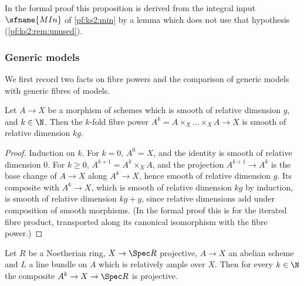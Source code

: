 In the formal proof this proposition is derived from the integral input $\sfname{MIn}$ of
\cref{pf:ks2:min} by a lemma which does not use that hypothesis (\cref{pf:ks2:rem:unused}).

\subsubsection{Generic models}

We first record two facts on fibre powers and the comparison of generic models with generic fibres
of models.

\begin{lemma}\label{pf:ks2:powsmooth}
Let $A\to X$ be a morphism of schemes which is smooth of relative dimension $g$, and $k\in\N$. Then
the $k$-fold fibre power $A^k=A\times_X\dots\times_XA\to X$ is smooth of relative dimension $kg$.
\end{lemma}

\begin{proof}
Induction on $k$. For $k=0$, $A^0=X$, and the identity is smooth of relative dimension $0$. For
$k\ge0$, $A^{k+1}=A^k\times_XA$, and the projection $A^{k+1}\to A^k$ is the base change of $A\to X$
along $A^k\to X$, hence smooth of relative dimension $g$. Its composite with $A^k\to X$, which is
smooth of relative dimension $kg$ by induction, is smooth of relative dimension $kg+g$, since
relative dimensions add under composition of smooth morphisms. (In the formal proof this is
 for the iterated fibre product, transported
along its canonical isomorphism with the fibre power.)
\end{proof}

\begin{lemma}\label{pf:ks2:powproj}
Let $R$ be a Noetherian ring, $X\to\Spec R$ projective, $A\to X$ an abelian scheme and $L$ a line
bundle on $A$ which is relatively ample over $X$. Then for every $k\in\N$ the composite
$A^k\to X\to\Spec R$ is projective.
\end{lemma}

